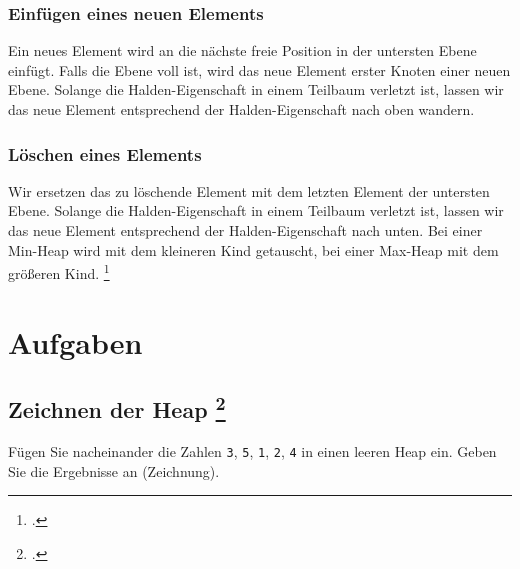 \documentclass{lehramt-informatik}
\begin{document}
%

\subsection{Einfügen eines neuen Elements}

Ein neues Element wird an die nächste freie Position in der untersten
Ebene einfügt. Falls die Ebene voll ist, wird das neue Element erster
Knoten einer neuen Ebene. Solange die Halden-Eigenschaft in einem
Teilbaum verletzt ist, lassen wir das neue Element entsprechend der
Halden-Eigenschaft nach oben wandern.

%

\subsection{Löschen eines Elements}

Wir ersetzen das zu löschende Element mit dem letzten Element der
untersten Ebene.
%
Solange die Halden-Eigenschaft in einem Teilbaum verletzt ist, lassen
wir das neue Element entsprechend der Halden-Eigenschaft nach unten.
%
Bei einer Min-Heap wird mit dem kleineren Kind getauscht, bei einer
Max-Heap mit dem größeren Kind.
\footcite[Seite 28]{aud:fs:tafeluebung-11}


\chapter{Aufgaben}

\section{Zeichnen der Heap
\footcite[Seite 4, Aufgabe 7: Heap (H 2012 (66115) - T2, A7, a/ii)]{aud:ab:7}}

Fügen Sie nacheinander die Zahlen \texttt{3}, \texttt{5}, \texttt{1},
\texttt{2}, \texttt{4} in einen leeren Heap ein. Geben Sie die
Ergebnisse an (Zeichnung).
\end{document}
